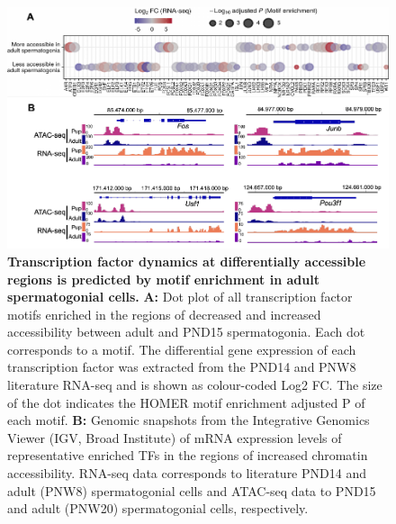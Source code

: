 \documentclass[12pt,twoside]{reedthesis}
\begin{document}
\begin{subfigures}

\begin{figure}[H]

{\centering \includegraphics{thesis_files/figure-latex/df4a-1} 

}

\caption[Transcription factor dynamics at differentially accessible regions is predicted by motif enrichment in adult spermatogonial cells]{\textbf{Transcription factor dynamics at differentially accessible regions is predicted by motif enrichment in adult spermatogonial cells.} \newline \textbf{A:} Dot plot of all transcription factor motifs enriched in the regions of decreased and increased accessibility between adult and PND15 spermatogonia. Each dot corresponds to a motif. The differential gene expression of each transcription factor was extracted from the PND14 and PNW8 literature RNA-seq and is shown as colour-coded Log2 FC. The size of the dot indicates the HOMER motif enrichment adjusted P of each motif. \newline \textbf{B:} Genomic snapshots from the Integrative Genomics Viewer (IGV, Broad Institute) of mRNA expression levels of representative enriched TFs in the regions of increased chromatin accessibility. RNA-seq data corresponds to literature PND14 and adult (PNW8) spermatogonial cells and  ATAC-seq data to PND15 and adult (PNW20) spermatogonial cells, respectively.}\label{fig:df4a}
\end{figure}

\begin{figure}[H]


\end{figure}
\end{subfigures}
\end{document}
